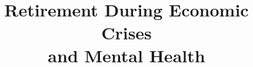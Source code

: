 \documentclass[arguments, manuscript, 11pt]{aastex631}
\begin{document}
\vspace{-1.5in} 

\title{
\phantom{hhhhhhh} \\ \phantom{hhhhhhh} \\ \Large Retirement During Economic Crises \\and Mental Health \\[8pt]}


\end{document}
